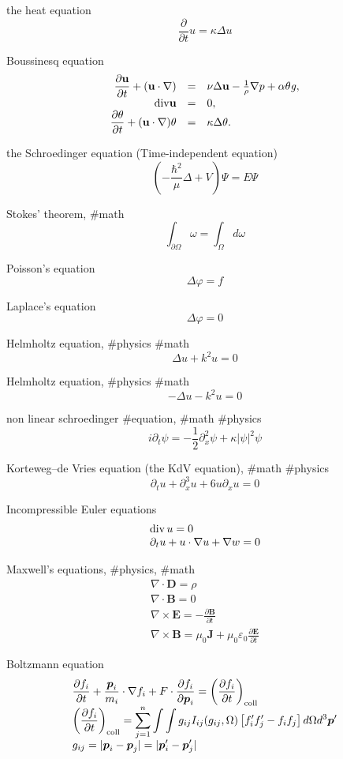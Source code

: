the heat equation
$$
\frac{\partial}{\partial t}u=\kappa\Delta u
$$

Boussinesq equation
$$
\begin{array}{rrl}
\displaystyle \frac{\partial {\bf u}}{\partial t}+({\bf u}\cdot\nabla) &=& \nu \Delta {\bf u}-\frac{1}{\rho}\nabla p+\alpha \theta {\bf {\it g}}, \\
\displaystyle {\rm div} {\bf u}&=&0, \\
\displaystyle \frac{\partial \theta}{\partial t}+({\bf u}\cdot\nabla)\theta &=& \kappa\Delta\theta.
\end{array} 
$$

the Schroedinger equation (Time-independent equation) 
$$
\textstyle (-\frac{\hbar^2}{\mu}\Delta+V)\Psi=E \Psi
$$

Stokes’ theorem, #math
$$
\displaystyle \int_{\partial \Omega}\omega=\int_{\Omega}d\omega
$$


Poisson's equation
$$
\Delta\varphi=f
$$

Laplace’s equation
$$
\Delta\varphi=0
$$

Helmholtz equation, #physics #math
$$
\Delta u + k^2 u=0
$$

Helmholtz equation, #physics #math
$$
-\Delta u - k^2 u=0
$$

non linear schroedinger #equation, #math #physics
$$
i \partial_t \psi = -\frac{1}{2}\partial^2_x\psi+\kappa|\psi|^2\psi
$$


Korteweg–de Vries equation (the KdV equation), #math #physics 
$$
\partial_t u+\partial^3_x u+6u\partial_x u=0
$$

Incompressible Euler equations
$$
\begin{array}{l}
{\rm div}\,u=0 \\
\partial_t u+u\cdot \nabla u+\nabla w=0
\end{array}
$$

Maxwell's equations, #physics, #math
$$
\begin{array}{l}
\nabla\cdot {\boldsymbol D}=\rho \\
\nabla\cdot {\boldsymbol B}=0 \\
\nabla\times {\boldsymbol E}=\displaystyle -\frac{\partial {\boldsymbol B}}{\partial t} \\
\nabla\times {\boldsymbol B}=\displaystyle \mu_0 {\boldsymbol J}+\mu_0 \varepsilon_0 \frac{\partial {\boldsymbol E}}{\partial t}
\end{array}
$$

Boltzmann equation
$$
\begin{array}{l}
\displaystyle \frac{\partial f_i}{\partial t}+\frac{{\boldsymbol p}_i}{m_i}\cdot \nabla f_i+F\cdot \frac{\partial f_i}{\partial {\boldsymbol p}_i}=\left(\frac{\partial f_i}{\partial t}\right)_{\rm coll} \\
\displaystyle \left(\frac{\partial f_i}{\partial t}\right)_{\rm coll}=\sum^n_{j=1}\int\int g_{ij}I_{ij}(g_{ij},\Omega)\left[f'_if'_j-f_if_j\right]d\Omega d^3{\boldsymbol p}' \\
\displaystyle g_{ij}=|{\boldsymbol p}_i-{\boldsymbol p}_j|=|{\boldsymbol p}'_i-{\boldsymbol p}'_j|
\end{array}
$$


